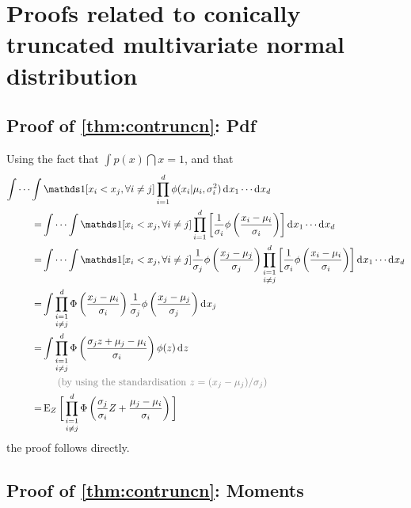 \section{Proofs related to conically truncated multivariate normal distribution}
\label{apx:contrunproof}

\subsection{Proof of \cref{thm:contruncn}: Pdf}

Using the fact that $\int p(x) \dint x = 1$, and that
  \begin{align*}
    \idotsint & \ind[x_i < x_j, \forall i \neq j] \prod_{i=1}^d \phi(x_i|\mu_i, \sigma_i^2) \dint x_1 \cdots \dint x_d \\
    =&  \idotsint \ind[x_i < x_j, \forall i \neq j] \prod_{i=1}^d \left[ \frac{1}{\sigma_i} \phi \left( \frac{x_i-\mu_i}{\sigma_i} \right) \right] \dint x_1 \cdots \dint x_d \\
    =&  \idotsint \ind[x_i < x_j, \forall i \neq j] \frac{1}{\sigma_j} \phi \left( \frac{x_j-\mu_j}{\sigma_j} \right)\mathop{\prod_{i=1}^d}_{i \neq j} \left[ \frac{1}{\sigma_i} \phi \left( \frac{x_i-\mu_i}{\sigma_i} \right) \right] \dint x_1 \cdots \dint x_d \\    
    =& \int \mathop{\prod_{i=1}^d}_{i \neq j} \Phi \left(\frac{x_j - \mu_i}{\sigma_i} \right) \frac{1}{\sigma_j} \phi \left( \frac{x_j-\mu_j}{\sigma_j} \right) \dint x_j \\
    =& \int \mathop{\prod_{i=1}^d}_{i \neq j} \Phi \left(\frac{\sigma_j z + \mu_j - \mu_i}{\sigma_i} \right) \phi(z) \dint z \\
    \phantom{=}&\phantom{==} {\color{gray} (\text{by using the standardisation } z = (x_j - \mu_j) / \sigma_j)} \\    
    =& \E_Z \bigg[ \mathop{\prod_{i=1}^d}_{i \neq j} \Phi \left(\frac{\sigma_j}{\sigma_i}Z + \frac{\mu_j - \mu_i}{\sigma_i} \right) \bigg] 
  \end{align*}
  the proof follows directly.

\subsection{Proof of \cref{thm:contruncn}: Moments}

